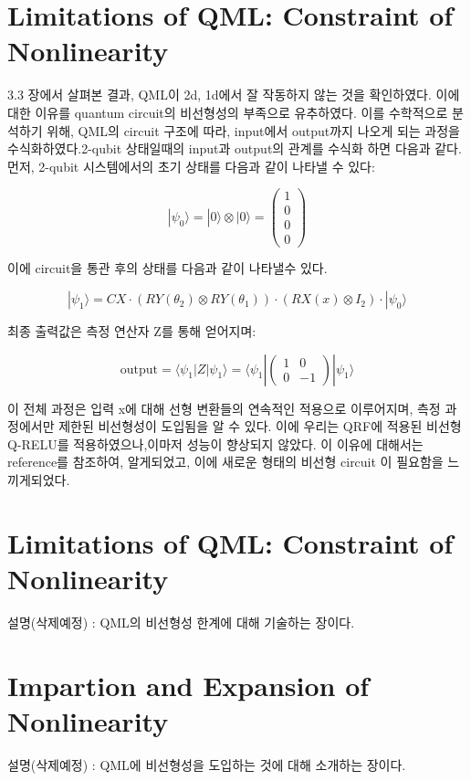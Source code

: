 \section{Limitations of QML: Constraint of Nonlinearity}

3.3 장에서 살펴본 결과, QML이 2d, 1d에서 잘 작동하지 않는 것을 확인하였다. 이에 대한 이유를 quantum circuit의 비선형성의 부족으로 유추하였다. 이를 수학적으로 분석하기 위해, QML의 circuit 구조에 따라, input에서 output까지 나오게 되는 과정을 수식화하였다.2-qubit 상태일때의 input과 output의 관계를 수식화 하면 다음과 같다.
먼저, 2-qubit 시스템에서의 초기 상태를 다음과 같이 나타낼 수 있다:

\[
|\psi_0\rangle = |0\rangle \otimes |0\rangle = \begin{pmatrix} 1 \\ 0 \\ 0 \\ 0 \end{pmatrix}
\]

이에  circuit을 통관 후의 상태를 다음과 같이 나타낼수 있다.

\[
|\psi_1\rangle = CX \cdot (RY(\theta_2) \otimes RY(\theta_1)) \cdot (RX(x) \otimes I_2) \cdot |\psi_0\rangle
\]

최종 출력값은 측정 연산자 Z를 통해 얻어지며:

\[
\text{output} = \langle\psi_1|Z|\psi_1\rangle = \langle\psi_1|\begin{pmatrix} 1 & 0 \\ 0 & -1 \end{pmatrix}|\psi_1\rangle
\]

이 전체 과정은 입력 x에 대해 선형 변환들의 연속적인 적용으로 이루어지며, 측정 과정에서만 제한된 비선형성이 도입됨을 알 수 있다. 이에 우리는 QRF에 적용된 비선형 Q-RELU를 적용하였으나,이마저 성능이 향상되지 않았다. 이 이유에 대해서는 reference를 참조하여,
알게되었고, 이에 새로운 형태의 비선형 circuit 이 필요함을 느끼게되었다.






\section{Limitations of QML: Constraint of Nonlinearity}
설명(삭제예정) : QML의 비선형성 한계에 대해 기술하는 장이다.


\section{Impartion and Expansion of Nonlinearity}
설명(삭제예정) : QML에 비선형성을 도입하는 것에 대해 소개하는 장이다.

